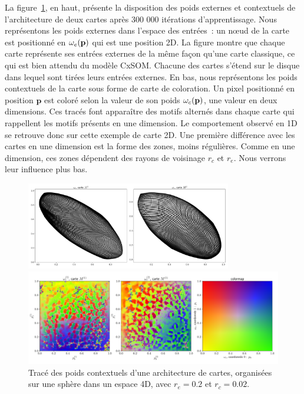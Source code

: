 \documentclass[../main]{subfiles}
\begin{document}
La figure~\ref{fig:2som_s_002_wc}, en haut, présente la disposition des poids externes et contextuels de l'architecture de deux cartes après 300 000 itérations d'apprentissage.
Nous représentons les poids externes dans l'espace des entrées~: un n\oe{}ud de la carte est positionné en $\omega_e(\mathbf{p})$ qui est une position 2D.
La figure  montre que chaque carte représente ses entrées externes de la même façon qu'une carte classique, ce qui est bien attendu du modèle CxSOM. Chacune des cartes s'étend sur le disque dans lequel sont tirées leurs entrées externes.
En bas, nous représentons les poids contextuels de la carte sous forme de carte de coloration. Un pixel positionné en position $\mathbf{p}$ est coloré selon la valeur de son poids $\omega_c(\mathbf{p})$, une valeur en deux dimensions.
Ces tracés font apparaître des motifs alternés dans chaque carte qui rappellent les motifs présents en une dimension. Le comportement observé en 1D se retrouve donc sur cette exemple de carte 2D.
Une première différence avec les cartes en une dimension est la forme des zones, moins régulières. Comme en une dimension, ces zones dépendent des rayons de voisinage $r_c$ et $r_e$. Nous verrons leur influence plus bas. 

\begin{figure}
	\begin{minipage}{\textwidth}
		\centering\includegraphics[width=0.8\textwidth]{we_rc002_afterbug.pdf}
	\end{minipage}
	\begin{minipage}{\textwidth}
		\centering\includegraphics[width=\textwidth]{wc_rc002_afterbug_nopoints.pdf}
		\caption{Tracé des poids contextuels d'une architecture de cartes, organisées sur une sphère dans un espace 4D, avec $r_e =0.2$ et $r_c = 0.02$.
		\label{fig:2som_s_002_wc}}
	\end{minipage}
\end{figure}
\end{document}
